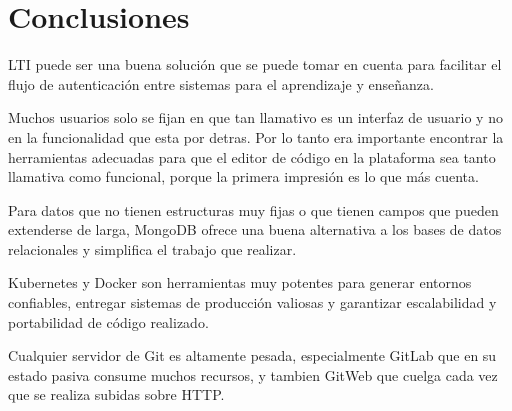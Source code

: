 
\chapter{Conclusiones}
\label{capitulo7}

LTI puede ser una buena solución que se puede tomar en cuenta para facilitar el flujo de autenticación entre sistemas para el aprendizaje y enseñanza.

Muchos usuarios solo se fijan en que tan llamativo es un interfaz de usuario y no en la funcionalidad que esta por detras. Por lo tanto era importante encontrar la herramientas adecuadas para que el editor de código en la plataforma sea tanto llamativa como funcional, porque la primera impresión es lo que más cuenta.

Para datos que no tienen estructuras muy fijas o que tienen campos que pueden extenderse de larga, MongoDB ofrece una buena alternativa a los bases de datos relacionales y simplifica el trabajo que realizar.

Kubernetes y Docker son herramientas muy potentes para generar entornos confiables, entregar sistemas de producción valiosas y garantizar escalabilidad y portabilidad de código realizado.

Cualquier servidor de Git es altamente pesada, especialmente GitLab que en su estado pasiva consume muchos recursos, y tambien GitWeb que cuelga cada vez que se realiza subidas sobre HTTP.


